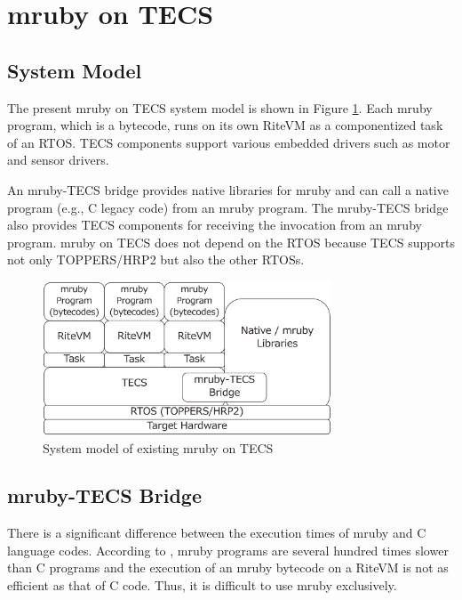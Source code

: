 \documentclass[conference]{IEEEtran/IEEEtran/IEEEtran}
\begin{document}

\section{mruby on TECS}
\subsection{System Model}
The present mruby on TECS system model is shown in Figure \ref{fig:mrubyontecs}.
Each mruby program, which is a bytecode, runs on its own RiteVM as a componentized task of an RTOS.
TECS components support various embedded drivers such as motor and sensor drivers.

An mruby-TECS bridge provides native libraries for mruby and can call a native program (e.g., C legacy code) from an mruby program.
The mruby-TECS bridge also provides TECS components for receiving the invocation from an mruby program.
mruby on TECS does not depend on the RTOS because TECS supports not only TOPPERS/HRP2 but also the other RTOSs.

\begin{figure}[t]
    \centering
    \includegraphics[width=8.6cm,clip]{figure/mrubyontecs.eps}
    \vspace{-2mm}
\caption{System model of existing mruby on TECS}
    \vspace{-2mm}
\label{fig:mrubyontecs}
\end{figure}

\subsection{mruby-TECS Bridge}
There is a significant difference between the execution times of mruby and C language codes.
According to  \cite{par:mrubyonTECS}, mruby programs are several hundred times slower than C programs and the execution of an mruby bytecode on a RiteVM is not as efficient as that of C code.
Thus, it is difficult to use mruby exclusively.
\end{document}
